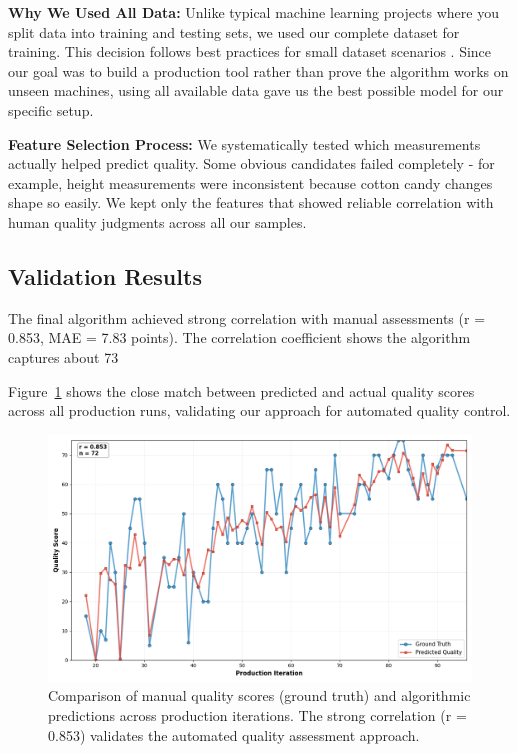 \textbf{Why We Used All Data:} Unlike typical machine learning projects where you split data into training and testing sets, we used our complete dataset for training. This decision follows best practices for small dataset scenarios \cite{Zaki2020}. Since our goal was to build a production tool rather than prove the algorithm works on unseen machines, using all available data gave us the best possible model for our specific setup.

\textbf{Feature Selection Process:} We systematically tested which measurements actually helped predict quality. Some obvious candidates failed completely - for example, height measurements were inconsistent because cotton candy changes shape so easily. We kept only the features that showed reliable correlation with human quality judgments across all our samples.

\subsection{Validation Results}

The final algorithm achieved strong correlation with manual assessments (r = 0.853, MAE = 7.83 points). The correlation coefficient shows the algorithm captures about 73%

Figure~\ref{fig:quality_comparison} shows the close match between predicted and actual quality scores across all production runs, validating our approach for automated quality control.

\begin{figure}[htbp]
    \centering
    \includegraphics[width=1\textwidth]{figures/ground_truth_vs_score3_iterations.png}
    \caption{Comparison of manual quality scores (ground truth) and algorithmic predictions across production iterations. The strong correlation (r = 0.853) validates the automated quality assessment approach.}
    \label{fig:quality_comparison}
\end{figure}

